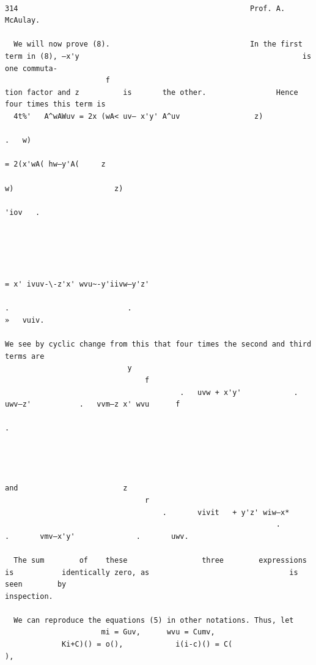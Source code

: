 \documentclass[10pt]{article}
\begin{document}
\begin{verbatim}

314                                                     Prof. A. McAulay.

  We will now prove (8).                                In the first term in (8), —x'y                                                   is       one commuta-
                       f
tion factor and z          is       the other.                Hence four times this term is
  4t%'   A^wAWuv = 2x (wA< uv— x'y' A^uv                 z)
                                                                                                .   w)
                                                                      = 2(x'wA( hw—y'A(     z
                                                                                                w)                       z)
                                                                                                                              'iov   .




                                                                      = x' ivuv-\-z'x' wvu~-y'iivw—y'z'
                                                                             .                           .                                               »   vuiv.

We see by cyclic change from this that four times the second and third
terms are
                            y
                                f
                                        .   uvw + x'y'            .   uwv—z'           .   vvm—z x' wvu      f
                                                                                                                     .




and                        z
                                r
                                    .       vivit   + y'z' wiw—x*
                                                              .                    .       vmv—x'y'              .       uwv.

  The sum        of    these                 three        expressions              is           identically zero, as                                is   seen        by
inspection.

  We can reproduce the equations (5) in other notations. Thus, let
                      mi = Guv,      wvu = Cumv,
             Ki+C)() = o(),            i(i-c)() = C(                                                                                         ),





\end{verbatim}
\end{document}
